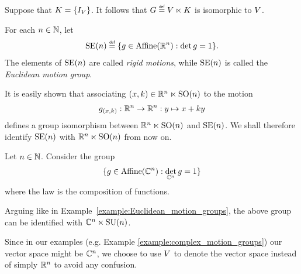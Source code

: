 \begin{example}
\label{example:trivial_case_of_motion_groups}
    Suppose that $K = \{{I_{V}}\}$.
    It follows that $\Group \defeq \VectorSpace \ltimes \CompactGroup$ is isomorphic to $V$.
\end{example}

\begin{example}
\label{example:Euclidean_motion_groups}
    For each $n \in \mathbb{N}$, let
    \begin{align*}
        \MotionGroup{n} \defeq \{g \in \AffineTransformations{\R^n} : \det g = 1\}.
    \end{align*}
    The elements of ${\mathrm{SE} (n)}$ are called \emph{rigid motions},
    while ${\mathrm{SE} (n)}$ is called the \emph{Euclidean motion group}.

    It is easily shown that associating $(x, k) \in \mathbb{R}^n \ltimes {\mathrm{SO} (n)}$ to the motion
    \begin{align*}
        g_{(x, k)} : \mathbb{R}^n \to \mathbb{R}^n : y \mapsto x + ky
    \end{align*}
    defines a group isomorphism between $\mathbb{R}^n \ltimes {\mathrm{SO} (n)}$ and ${\mathrm{SE} (n)}$.
    We shall therefore identify ${\mathrm{SE} (n)}$ with $\mathbb{R}^n \ltimes {\mathrm{SO} (n)}$ from now on.
\end{example}

\begin{example}
    \label{example:complex_motion_groups}
    Let $n \in \mathbb{N}$.
    Consider the group
    \begin{align*}
        \{g \in {\mathrm{Affine} (\mathbb{C}^n)} : \det_{\mathbb{C}^n} g = 1\}
    \end{align*}
    where the law is the composition of functions.

    Arguing like in Example~\ref{example:Euclidean_motion_groups},
    the above group can be identified with $\mathbb{C}^n \ltimes {\mathrm{SU} (n)}$.
\end{example}

\begin{remark}
    Since in our examples (e.g. Example \ref{example:complex_motion_groups}) our vector space might be $\mathbb{C}^n$,
    we choose to use $V$ to denote the vector space instead of simply $\mathbb{R}^n$ to avoid any confusion.
\end{remark}

